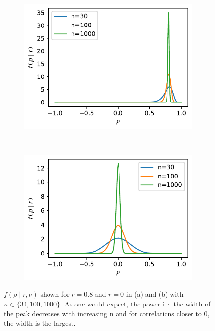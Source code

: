 \documentclass[../Thesis.tex]{subfiles}
\begin{document}
\begin{figure}[h]
    \centering
    \begin{subfigure}[t]{0.49\linewidth}
        \centering
        \includegraphics[width=\linewidth]{figures/Gaussian correlation confidence dist/density comparison r 0.8.pdf}
        \caption{}
        \label{subfig:gaussian correlation dist 0.8}
    \end{subfigure}%
    ~
    \begin{subfigure}[t]{0.49\linewidth}
        \centering
        \includegraphics[width=\linewidth]{figures/Gaussian correlation confidence dist/density comparison r 0.pdf}
        \caption{}
        \label{subfig:gaussian correlation dist 0}
    \end{subfigure}
    \caption{$f\left(\rho \mid r, \nu\right)$ shown for $r=0.8$ and $r=0$ in (a) and (b) with $n\in \{30,100,1000\}$. As one would expect, the power i.e. the width of the peak decreases with increasing n and for correlations closer to $0$, the width is the largest.}
\end{figure}
\end{document}
